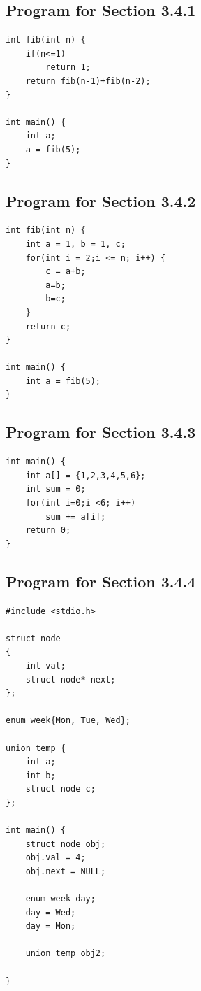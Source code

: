 \documentclass{article}
\begin{document}
\subsection{Program for Section 3.4.1}
\begin{flushleft}
\label{p1}
\begin{lstlisting}
int fib(int n) {
	if(n<=1)
		return 1;
	return fib(n-1)+fib(n-2);
}

int main() {
	int a;
	a = fib(5);
}
\end{lstlisting}
\end{flushleft}

\subsection{Program for Section 3.4.2}
\begin{flushleft}
\label{p2}
\begin{lstlisting}
int fib(int n) {
	int a = 1, b = 1, c;
	for(int i = 2;i <= n; i++) {
		c = a+b;
		a=b;
		b=c;
	} 
	return c;
}

int main() {
	int a = fib(5);
}
\end{lstlisting}
\end{flushleft}

\subsection{Program for Section 3.4.3}
\begin{flushleft}
\label{p3}
\begin{lstlisting}
int main() {    
    int a[] = {1,2,3,4,5,6};
	int sum = 0;
	for(int i=0;i <6; i++) 
		sum += a[i];
    return 0;
}
\end{lstlisting}
\end{flushleft}
\newpage

\subsection{Program for Section 3.4.4}
\begin{flushleft}
\label{p4}
\begin{lstlisting}
#include <stdio.h>

struct node
{
	int val;
	struct node* next;
};

enum week{Mon, Tue, Wed};

union temp {
	int a;
	int b;
	struct node c;
};

int main() {
	struct node obj;
	obj.val = 4;
	obj.next = NULL;

    enum week day;
    day = Wed;
 	day = Mon;

 	union temp obj2;
       
}
\end{lstlisting}
\end{flushleft}
\end{document}
